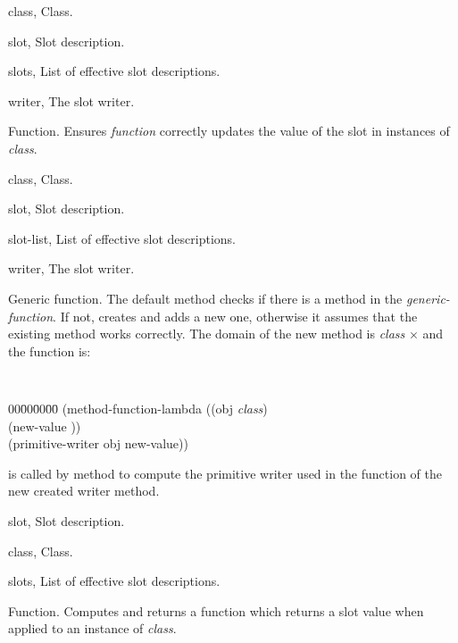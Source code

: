 \begin{optDefinition}
%
\begin{genericargs}
    \item[class, \classref{class}] Class.
    \item[slot, \classref{slot}] Slot description.
    \item[slots, \classref{list}] List of effective slot
    descriptions.
    \item[writer, \classref{function}] The slot writer.
\end{genericargs}
%
\result%
Function.
%
\remarks%
Ensures {\em function} correctly updates the value of the slot in
instances of {\em class}.

%
\begin{specargs}
    \item[class, \classref{class}] Class.
    \item[slot, \classref{slot}] Slot description.
    \item[slot-list, \classref{list}] List of effective slot
    descriptions.
    \item[writer, \classref{generic-function}] The slot writer.
\end{specargs}
%
\result%
Generic function.
%
\remarks%
The default method checks if there is a method in the {\em
generic-function}. If not, creates and adds a new one, otherwise it
assumes that the existing method works correctly. The domain of
the new method is {\em class} $\times$  and the
function is:
%
{\tt
\begin{tabbing}
    00\=00\=00\=00\= \kill%
    (method-function-lambda ((obj {\em class})\\
    \>\>(new-value ))\\
    \>(primitive-writer obj new-value))
\end{tabbing}
}
%
 is called by
 method to compute the primitive writer used in
the function of the new created writer method.

%
\begin{genericargs}
    \item[slot, \classref{slot}] Slot description.
    \item[class, \classref{class}] Class.
    \item[slots, \classref{list}] List of effective slot
    descriptions.
\end{genericargs}
%
\result%
Function.
%
\remarks%
Computes and returns a function which returns a slot value when
applied to an instance of {\em class}.


\end{optDefinition}
